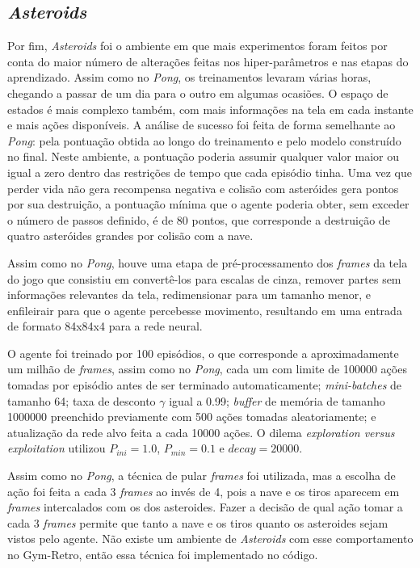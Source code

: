 \subsection{\textit{Asteroids}}
\label{sec:exp_asteroids}

Por fim, \textit{Asteroids} foi o ambiente em que mais experimentos foram feitos por conta do maior número de alterações feitas nos hiper-parâmetros e nas etapas do aprendizado.
Assim como no \textit{Pong}, os treinamentos levaram várias horas, chegando a passar de um dia para o outro em algumas ocasiões.
O espaço de estados é mais complexo também, com mais informações na tela em cada instante e mais ações disponíveis.
A análise de sucesso foi feita de forma semelhante ao \textit{Pong}: pela pontuação obtida ao longo do treinamento e pelo modelo construído no final.
Neste ambiente, a pontuação poderia assumir qualquer valor maior ou igual a zero dentro das restrições de tempo que cada episódio tinha.
Uma vez que perder vida não gera recompensa negativa e colisão com asteróides gera pontos por sua destruição, a pontuação mínima que o agente poderia obter, sem exceder o número de passos definido, é de 80 pontos, que corresponde a destruição de quatro asteróides grandes por colisão com a nave.

Assim como no \textit{Pong}, houve uma etapa de pré-processamento dos \textit{frames} da tela do jogo que consistiu em convertê-los para escalas de cinza, remover partes sem informações relevantes da tela, redimensionar para um tamanho menor, e enfileirair para que o agente percebesse movimento, resultando em uma entrada de formato 84x84x4 para a rede neural.

O agente foi treinado por 100 episódios, o que corresponde a aproximadamente um milhão de \textit{frames}, assim como no \textit{Pong}, cada um com limite de 100000 ações tomadas por episódio antes de ser terminado automaticamente;
\textit{mini-batches} de tamanho 64;
taxa de desconto $\gamma$ igual a 0.99;
\textit{buffer} de memória de tamanho 1000000 preenchido previamente com 500 ações tomadas aleatoriamente;
e atualização da rede alvo feita a cada 10000 ações.
O dilema \textit{exploration versus exploitation} utilizou $P_{ini} = 1.0$, $P_{min} = 0.1$ e $decay = 20000$.

Assim como no \textit{Pong}, a técnica de pular \textit{frames} foi utilizada, mas a escolha de ação foi feita a cada 3 \textit{frames} ao invés de 4, pois a nave e os tiros aparecem em \textit{frames} intercalados com os dos asteroides.
Fazer a decisão de qual ação tomar a cada 3 \textit{frames} permite que tanto a nave e os tiros quanto os asteroides sejam vistos pelo agente.
Não existe um ambiente de \textit{Asteroids} com esse comportamento no Gym-Retro, então essa técnica foi implementado no código.

